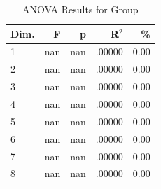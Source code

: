 \begin{table}[H]
  \centering
  \caption{ANOVA Results for Group}
  \label{tab:anova_group}
  \begin{tabular}{l r r r r}
    Dim. & F & p & R$^2$ & \% \\
    \hline
    1 & nan & nan & .00000 & 0.00 \\
    2 & nan & nan & .00000 & 0.00 \\
    3 & nan & nan & .00000 & 0.00 \\
    4 & nan & nan & .00000 & 0.00 \\
    5 & nan & nan & .00000 & 0.00 \\
    6 & nan & nan & .00000 & 0.00 \\
    7 & nan & nan & .00000 & 0.00 \\
    8 & nan & nan & .00000 & 0.00 \\
  \end{tabular}
\end{table}
